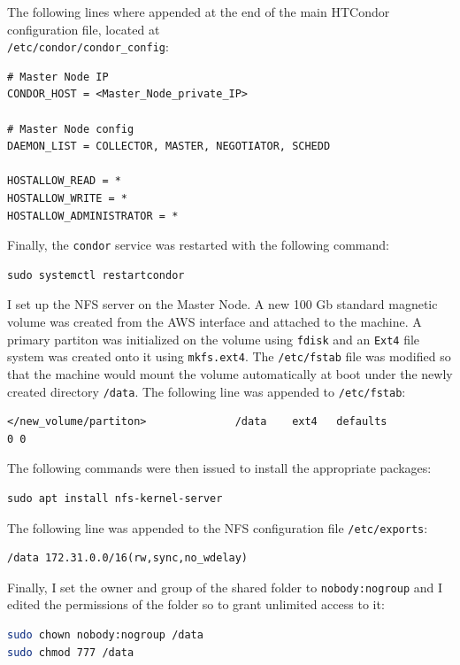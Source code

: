 \documentclass{article}
\begin{document}
The following lines where appended at the end of the main HTCondor configuration file, located at\\
\texttt{/etc/condor/condor\_config}:

\begin{lstlisting}
# Master Node IP
CONDOR_HOST = <Master_Node_private_IP>

# Master Node config 
DAEMON_LIST = COLLECTOR, MASTER, NEGOTIATOR, SCHEDD

HOSTALLOW_READ = *
HOSTALLOW_WRITE = *
HOSTALLOW_ADMINISTRATOR = *
\end{lstlisting}

Finally, the \texttt{condor} service was restarted with the following command:

\begin{lstlisting}
sudo systemctl restartcondor
\end{lstlisting}

I set up the NFS server on the Master Node.
A new 100 Gb standard magnetic volume was created from the AWS interface and attached to the machine.
A primary partiton was initialized on the volume using \texttt{fdisk} and an \texttt{Ext4} file system was created onto it using \texttt{mkfs.ext4}.
The \texttt{/etc/fstab} file was modified so that the machine would mount the volume automatically at boot under the newly created directory \texttt{/data}.
The following line was appended to \texttt{/etc/fstab}:

\begin{lstlisting}
</new_volume/partiton>              /data    ext4   defaults                0 0
\end{lstlisting}

The following commands were then issued to install the appropriate packages:

\begin{lstlisting}
sudo apt install nfs-kernel-server
\end{lstlisting}

The following line was appended to the NFS configuration file \texttt{/etc/exports}:

\begin{lstlisting}
/data 172.31.0.0/16(rw,sync,no_wdelay)
\end{lstlisting}

Finally, I set the owner and group of the shared folder to \texttt{nobody:nogroup} and I edited the permissions of the folder so to grant unlimited access to it:

\begin{lstlisting}[language=bash]
sudo chown nobody:nogroup /data
sudo chmod 777 /data
\end{lstlisting}
\end{document}
